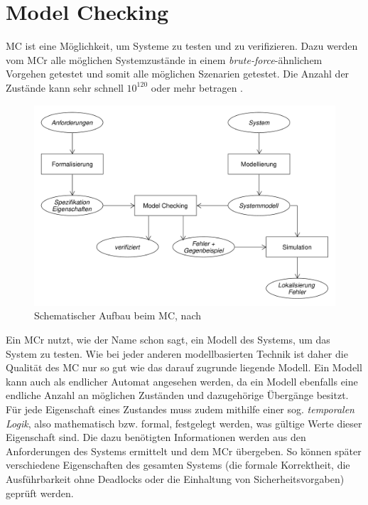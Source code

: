 \section{Model Checking}\label{sec:modelchecking}

\ac{MC} ist eine Möglichkeit, um Systeme zu testen und zu verifizieren. Dazu werden vom \ac{MCr} alle möglichen Systemzustände in einem \emph{brute-force}-ähnlichem Vorgehen getestet und somit alle möglichen Szenarien getestet. Die Anzahl der Zustände kann sehr schnell $ 10^{120} $ oder mehr betragen \cite{Grumberg1999,Baier2008}.

\begin{figure}
	\includegraphics{./images/mcSchema.pdf}
	\caption[Schematischer Aufbau beim MC]{Schematischer Aufbau beim MC, nach \cite{Baier2008}}
	\label{fig:mcSchema}
\end{figure}

Ein \ac{MCr} nutzt, wie der Name schon sagt, ein Modell des Systems, um das System zu testen. Wie bei jeder anderen modellbasierten Technik ist daher die Qualität des \ac{MC} nur so gut wie das darauf zugrunde liegende Modell. Ein Modell kann auch als endlicher Automat angesehen werden, da ein Modell ebenfalls eine endliche Anzahl an möglichen Zuständen und dazugehörige Übergänge besitzt. Für jede Eigenschaft eines Zustandes muss zudem mithilfe einer sog. \emph{temporalen Logik}, also mathematisch bzw. formal, festgelegt werden, was gültige Werte dieser Eigenschaft sind. Die dazu benötigten Informationen werden aus den Anforderungen des Systems ermittelt und dem \ac{MCr} übergeben. So können später verschiedene Eigenschaften des gesamten Systems (\zB die formale Korrektheit, die Ausführbarkeit ohne Deadlocks oder die Einhaltung von Sicherheitsvorgaben) geprüft werden.

